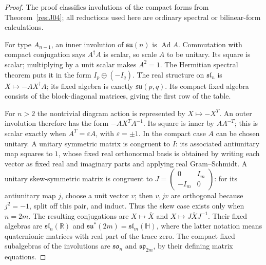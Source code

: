 \begin{proof}
The proof classifies involutions of the compact forms from
Theorem~\ref{res:J04}; all reductions used here are ordinary
spectral or bilinear-form calculations.

For type \(A_{n-1}\), an inner involution of
\(\mathfrak{su}(n)\) is \(\operatorname{Ad}A\).
Commutation with compact conjugation says \(A^\dagger A\)
is scalar, so scale \(A\) to be unitary.
Its square is scalar; multiplying by a unit scalar makes
\(A^2=1\). The Hermitian spectral theorem puts it in the
form \(I_p\oplus(-I_q)\).
The real structure on \(\mathfrak{sl}_n\) is
\(X\mapsto-A X^\dagger A\); its fixed algebra is exactly
\(\mathfrak{su}(p,q)\).
Its compact fixed algebra consists of the block-diagonal
matrices, giving the first row of the table.

For \(n>2\) the nontrivial diagram action is represented by
\(X\mapsto-X^T\). An outer involution therefore has the form
\(-A X^T A^{-1}\). Its square is inner by \(A A^{-T}\);
this is scalar exactly when \(A^T=\varepsilon A\), with
\(\varepsilon=\pm1\). In the compact case \(A\) can be
chosen unitary. A unitary symmetric matrix is congruent
to \(I\): its associated antiunitary map squares to \(1\),
whose fixed real orthonormal basis is obtained by writing
each vector as fixed real and imaginary parts and applying
real Gram--Schmidt. A unitary skew-symmetric matrix is
congruent to
\(J=\left(\begin{smallmatrix}0&I_m\\-I_m&0\end{smallmatrix}\right)\):
for its antiunitary map \(j\), choose a unit vector \(v\);
then \(v,jv\) are orthogonal because \(j^2=-1\), split off
this pair, and induct. Thus the skew case exists only
when \(n=2m\).
The resulting conjugations are \(X\mapsto\overline X\)
and \(X\mapsto J\overline XJ^{-1}\).
Their fixed algebras are
\(\mathfrak{sl}_n(\mathbb R)\) and
\(\mathfrak{su}^*(2m)=\mathfrak{sl}_m(\mathbb H)\), where
the latter notation means quaternionic matrices with real
part of the trace zero. The compact fixed subalgebras
of the involutions are \(\mathfrak{so}_n\) and
\(\mathfrak{sp}_{2m}\), by their defining matrix equations.


\end{proof}
